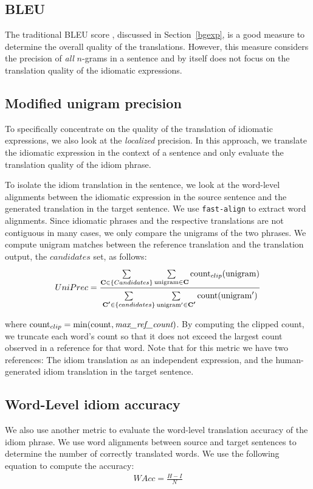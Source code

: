\subsection{BLEU} The traditional BLEU score \citep{Papineni2001}, discussed in Section~\ref{bgexp}, is a good measure to determine the overall quality of the translations. 
However, this measure considers the precision of \textit{all} $n$-grams  in a sentence and by itself does not focus on the translation quality of the idiomatic expressions.

\subsection{Modified unigram precision} 
To specifically concentrate on the quality of the translation of idiomatic expressions, we also look at the \textit{localized} precision. 
In this approach, we translate the idiomatic expression in the context of a sentence and only evaluate the translation quality of the idiom phrase. 

To isolate the idiom translation in the sentence, we look at the word-level alignments between the idiomatic expression in the source sentence and the generated translation in the target sentence. 
We use \texttt{fast-align} \citep{dyer-chahuneau-smith:2013:NAACL-HLT} to extract word alignments.
Since idiomatic phrases and the respective translations are not contiguous in many cases, we only compare the unigrams of the two phrases.
We compute unigram matches between the reference translation and the translation output, the $candidates$ set, as follows:
\begin{equation} 
UniPrec = \frac{ \sum\limits_{\bm{\mathbf{C}} \in \{Candidates\}}^{} \sum\limits_{{\operatorname*{unigram}} \in \bm{\mathbf{C}}}^{} \operatorname*{count}_{clip}({\operatorname*{unigram}}) }{  \sum\limits_{\bm{\mathbf{C'}} \in \{candidates\}}^{} \sum\limits_{{\operatorname*{unigram} }' \in \bm{\mathbf{C'}}}^{} \operatorname*{count}({\operatorname*{unigram}}')  }
\end{equation}

\noindent where $\operatorname*{count}_{clip} = \min(\operatorname*{count}, \textit{max\_ref\_count})$.
By computing the clipped count, we truncate each word's count so that it does not exceed the largest count observed in a reference for that word.
Note that for this metric %
we have two references: The idiom translation as an independent expression, and the human-generated idiom translation in the target sentence. 

\subsection{Word-Level idiom accuracy} We also use another metric to evaluate the word-level translation accuracy of the idiom phrase. 
We use word alignments between source and target sentences to determine the number of correctly translated words.
We use the following equation to compute the accuracy:
\begin{align} 
WAcc = \frac{H-I}{N}
\end{align} 


